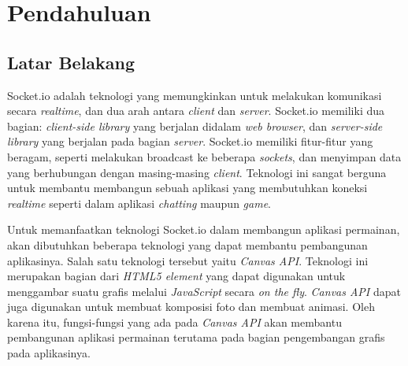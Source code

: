 \chapter{Pendahuluan}
\label{chap:intro}
   
\section{Latar Belakang}
\label{sec:label}



Socket.io adalah teknologi yang memungkinkan untuk melakukan komunikasi secara \textit{realtime}, dan dua arah antara \textit{client} dan \textit{server}. Socket.io memiliki dua bagian: \textit{client-side library} yang berjalan didalam \textit{web browser}, dan \textit{server-side library} yang berjalan pada bagian \textit{server}. Socket.io memiliki fitur-fitur yang beragam, seperti melakukan broadcast ke beberapa \textit{sockets}, dan menyimpan data yang berhubungan dengan masing-masing \textit{client}. Teknologi ini sangat berguna untuk membantu membangun sebuah aplikasi yang membutuhkan koneksi \textit{realtime} seperti dalam aplikasi \textit{chatting} maupun \textit{game}.

Untuk memanfaatkan teknologi Socket.io dalam membangun aplikasi permainan, akan dibutuhkan beberapa teknologi yang dapat membantu pembangunan aplikasinya. Salah satu teknologi tersebut yaitu \textit{Canvas API}. Teknologi ini merupakan bagian dari \textit{HTML5 element} yang dapat digunakan untuk menggambar suatu grafis melalui \textit{JavaScript} secara \textit{on the fly}. \textit{Canvas API} dapat juga digunakan untuk membuat komposisi foto dan membuat animasi. Oleh karena itu, fungsi-fungsi yang ada pada \textit{Canvas API} akan membantu pembangunan aplikasi permainan terutama pada bagian pengembangan grafis pada aplikasinya.

